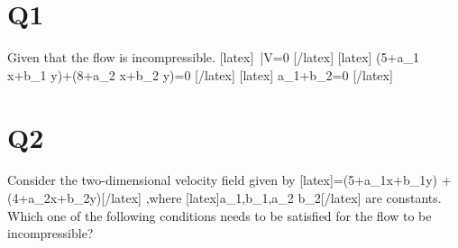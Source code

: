 \section*{Q1}
Given that the flow is incompressible.
[latex] \therefore \quad {}\,\bar{V}=0 [/latex]
[latex] \left(5+a_{1} x+b_{1} y\right)+\left(8+a_{2} x+b_{2} y\right)=0 [/latex]
[latex] a_{1}+b_{2}=0 [/latex]

\section*{Q2}
Consider the two-dimensional velocity field  given by [latex]=(5+a_{1}x+b_{1}y)\: + \:  (4+a_{2}x+b_{2}y)[/latex] ,where [latex]a_1,b_1,a_2 b_2[/latex]  are constants. Which one of the following conditions needs to be satisfied for the flow to be  incompressible?
